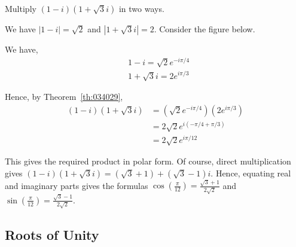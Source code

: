 \documentclass{ximera}
\begin{document}
\begin{example}\label{ex:034047}
Multiply $(1-i)(1+\sqrt{3}i)$ in two ways.

\begin{explanation}
We have $|1 - i| = \sqrt{2}$ and $|1 + \sqrt{3}i| = 2$.  Consider the figure below.

\begin{center}
\end{center}

We have,
\begin{align*}
& 1-i = \sqrt{2} e^{-i\pi /4} \\
& 1+ \sqrt{3}i = 2e^{i\pi /3}
\end{align*}

Hence, by Theorem~\ref{th:034029},
\begin{align*}
(1-i)(1+\sqrt{3}i) &= (\sqrt{2} e^{-i\pi /4})(2e^{i\pi /3}) \\
&= 2\sqrt{2} e^{i(-\pi/4 + \pi/3)} \\
&= 2 \sqrt{2} e^{i\pi/12}
\end{align*}

This gives the required product in polar form. Of course, direct multiplication gives $(1 - i)(1 + \sqrt{3}i) = (\sqrt{3} + 1) + (\sqrt{3} - 1)i$. Hence, equating real and imaginary parts gives the formulas $\cos (\frac{\pi}{12}) = \frac{\sqrt{3}+1}{2\sqrt{2}}$ and $\sin (\frac{\pi}{12}) = \frac{\sqrt{3}-1}{2\sqrt{2}}$.
\end{explanation}
\end{example}

\subsection*{Roots of Unity}
\end{document}
